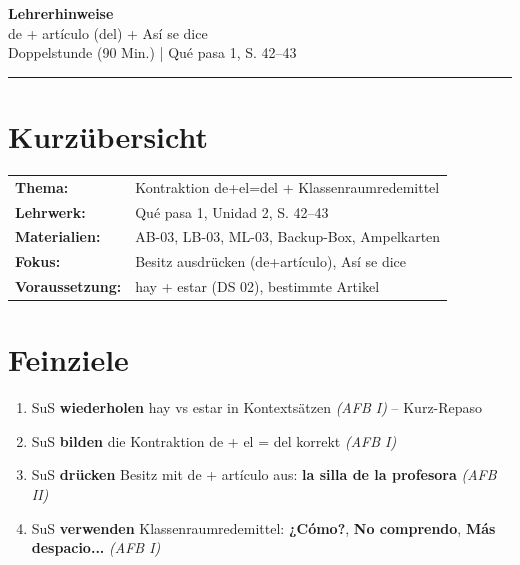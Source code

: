 \documentclass[11pt,a4paper]{article}
\newcommand{\es}[1]{\textbf{#1}}
\begin{document}
\begin{center}
{\Large\textcolor{fach}{\textbf{Lehrerhinweise}}}\\[0.3cm]
{\large de + artículo (del) + Así se dice}\\[0.2cm]
{\normalsize Doppelstunde (90 Min.) | Qué pasa 1, S. 42--43}
\end{center}

\vspace{0.5cm}
\hrule
\vspace{0.5cm}

\section*{Kurzübersicht}

\begin{tabular}{ll}
\textbf{Thema:} & Kontraktion de+el=del + Klassenraumredemittel \\
\textbf{Lehrwerk:} & Qué pasa 1, Unidad 2, S. 42--43 \\
\textbf{Materialien:} & AB-03, LB-03, ML-03, Backup-Box, Ampelkarten \\
\textbf{Fokus:} & Besitz ausdrücken (de+artículo), Así se dice \\
\textbf{Voraussetzung:} & hay + estar (DS 02), bestimmte Artikel \\
\end{tabular}

\vspace{0.5cm}

\section*{Feinziele}

\begin{enumerate}[label=\textbf{FZ\arabic*:}, leftmargin=2.5em]
    \item SuS \textbf{wiederholen} hay vs estar in Kontextsätzen \textit{(AFB I)} -- Kurz-Repaso
    \item SuS \textbf{bilden} die Kontraktion de + el = del korrekt \textit{(AFB I)}
    \item SuS \textbf{drücken} Besitz mit de + artículo aus: \es{la silla de la profesora} \textit{(AFB II)}
    \item SuS \textbf{verwenden} Klassenraumredemittel: \es{¿Cómo?}, \es{No comprendo}, \es{Más despacio...} \textit{(AFB I)}
\end{enumerate}
\end{document}
